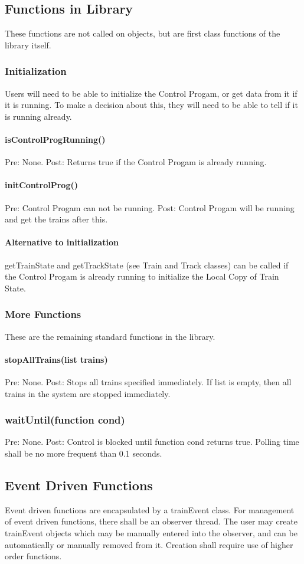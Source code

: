 \documentclass[a4paper,11pt,notitlepage]{article}
\def\CS{Control Progam\xspace}
\def\LC{Local Copy of Train State\xspace}
\begin{document}
\subsection{Functions in Library}
These functions are not called on objects, but are first class functions of the library itself.

\subsubsection{Initialization}
Users will need to be able to initialize the \CS, or get data from it if it is running. To make a decision about this, they will need to be able to tell if it is running already.
\paragraph{isControlProgRunning()} Pre: None. Post: Returns true if the \CS is already running.
\paragraph{initControlProg()} Pre: \CS can not be running. Post: \CS will be running and get the trains after this. %
\paragraph{Alternative to initialization} getTrainState and getTrackState (see Train and Track classes) can be called if the \CS is already running to initialize the \LC.
\subsubsection{More Functions}
These are the remaining standard functions in the library.
\paragraph{stopAllTrains(list trains)} Pre: None. Post: Stops all trains specified immediately. If list is empty, then all trains in the system are stopped immediately.
\subsubsection{waitUntil(function cond)} Pre: None. Post: Control is blocked until function cond returns true. Polling time shall be no more frequent than 0.1 seconds.

\subsection{Event Driven Functions}
Event driven functions are encapsulated by a trainEvent class. For management of event driven functions, there shall be an observer thread. The user may create trainEvent objects which may be manually entered into the observer, and can be automatically or manually removed from it. Creation shall require use of higher order functions.
\end{document}
